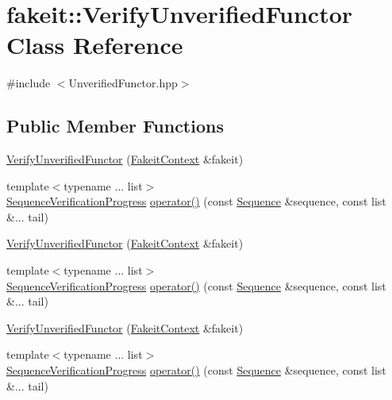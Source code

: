 \hypertarget{classfakeit_1_1VerifyUnverifiedFunctor}{}\section{fakeit\+::Verify\+Unverified\+Functor Class Reference}
\label{classfakeit_1_1VerifyUnverifiedFunctor}


{\ttfamily \#include $<$Unverified\+Functor.\+hpp$>$}

\subsection*{Public Member Functions}
\begin{DoxyCompactItemize}
\item 
\mbox{\hyperlink{classfakeit_1_1VerifyUnverifiedFunctor_adb55c8a4cdd929e88557f94d0b4fdf1e}{Verify\+Unverified\+Functor}} (\mbox{\hyperlink{structfakeit_1_1FakeitContext}{Fakeit\+Context}} \&fakeit)
\item 
{\footnotesize template$<$typename ... list$>$ }\\\mbox{\hyperlink{classfakeit_1_1SequenceVerificationProgress}{Sequence\+Verification\+Progress}} \mbox{\hyperlink{classfakeit_1_1VerifyUnverifiedFunctor_ac32fd9aaa7de99c3b6b89c39b642ecad}{operator()}} (const \mbox{\hyperlink{classfakeit_1_1Sequence}{Sequence}} \&sequence, const list \&... tail)
\item 
\mbox{\hyperlink{classfakeit_1_1VerifyUnverifiedFunctor_adb55c8a4cdd929e88557f94d0b4fdf1e}{Verify\+Unverified\+Functor}} (\mbox{\hyperlink{structfakeit_1_1FakeitContext}{Fakeit\+Context}} \&fakeit)
\item 
{\footnotesize template$<$typename ... list$>$ }\\\mbox{\hyperlink{classfakeit_1_1SequenceVerificationProgress}{Sequence\+Verification\+Progress}} \mbox{\hyperlink{classfakeit_1_1VerifyUnverifiedFunctor_ac32fd9aaa7de99c3b6b89c39b642ecad}{operator()}} (const \mbox{\hyperlink{classfakeit_1_1Sequence}{Sequence}} \&sequence, const list \&... tail)
\item 
\mbox{\hyperlink{classfakeit_1_1VerifyUnverifiedFunctor_adb55c8a4cdd929e88557f94d0b4fdf1e}{Verify\+Unverified\+Functor}} (\mbox{\hyperlink{structfakeit_1_1FakeitContext}{Fakeit\+Context}} \&fakeit)
\item 
{\footnotesize template$<$typename ... list$>$ }\\\mbox{\hyperlink{classfakeit_1_1SequenceVerificationProgress}{Sequence\+Verification\+Progress}} \mbox{\hyperlink{classfakeit_1_1VerifyUnverifiedFunctor_ac32fd9aaa7de99c3b6b89c39b642ecad}{operator()}} (const \mbox{\hyperlink{classfakeit_1_1Sequence}{Sequence}} \&sequence, const list \&... tail)

\end{DoxyCompactItemize}
